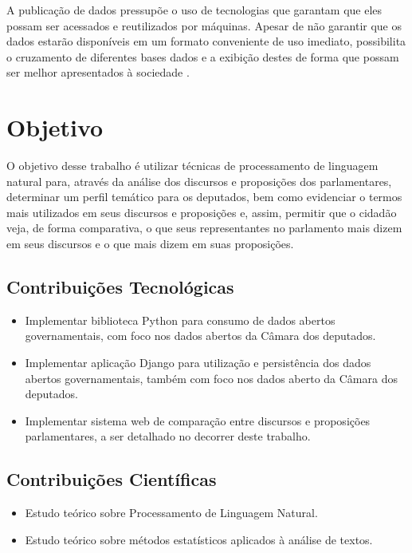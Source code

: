 A publicação de dados pressupõe o uso de tecnologias que garantam que eles possam ser acessados e reutilizados por máquinas. Apesar de não garantir que os dados estarão disponíveis em um formato conveniente de uso imediato, possibilita o cruzamento de diferentes bases dados e a exibição destes de forma que possam ser melhor apresentados à sociedade \cite{diniz2010}.

\section{Objetivo}
\label{sec:objetivo}

O objetivo desse trabalho é utilizar técnicas de processamento de linguagem natural para, através da análise dos discursos e proposições dos parlamentares, determinar um perfil temático para os deputados, bem como evidenciar o termos mais utilizados em seus discursos e proposições e, assim, permitir que o cidadão veja, de forma comparativa, o que seus representantes no parlamento mais dizem em seus discursos e o que mais dizem em suas proposições.

\subsection{Contribuições Tecnológicas}
\label{sub:contribuicoes_tecnologicas}

\begin{itemize}
    \item Implementar biblioteca Python para consumo de dados abertos governamentais, com foco nos dados abertos da Câmara dos deputados.
    \item Implementar aplicação Django para utilização e persistência dos dados abertos governamentais, também com foco nos dados aberto da Câmara dos deputados.
    \item Implementar sistema web de comparação entre discursos e proposições parlamentares, a ser detalhado no decorrer deste trabalho.
\end{itemize}

\subsection{Contribuições Científicas}
\label{sub:contribuições_científicas}

\begin{itemize}
    \item Estudo teórico sobre Processamento de Linguagem Natural.
    \item Estudo teórico sobre métodos estatísticos aplicados à análise de textos.
\end{itemize}

